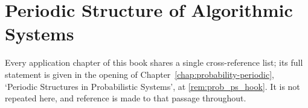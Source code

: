 \chapter{Periodic Structure of Algorithmic Systems}
\label{chap:algorithm-periodic}

\begin{remark}\label{rem:algorithm_ps_hook}
Every application chapter of this book shares a single cross-reference list; its full statement is given in the opening of Chapter~\ref{chap:probability-periodic}, `Periodic Structures in Probabilistic Systems', at \cref{rem:prob_ps_hook}. It is not repeated here, and reference is made to that passage throughout.
\end{remark}

